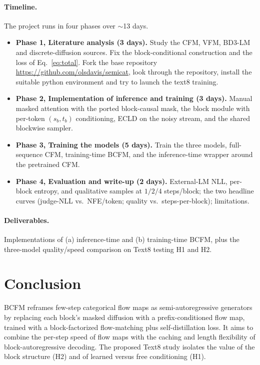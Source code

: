 \documentclass[twocolumn]{style}
\begin{document}
\paragraph{Timeline.} The project runs in four phases over $\sim$13 days.
\begin{itemize}
\item \textbf{Phase 1, Literature analysis (3 days).} Study the CFM, VFM, BD3-LM and discrete-diffusion sources. Fix the block-conditional construction and the loss of Eq.~\eqref{eq:total}. Fork the base repository \url{https://github.com/olsdavis/semicat}, look through the repository, install the suitable python environment and try to launch the text8 training.
\item \textbf{Phase 2, Implementation of inference and training (3 days).} Manual masked attention with the ported block-causal mask, the block module with per-token $(s_b,t_b)$ conditioning, ECLD on the noisy stream, and the shared blockwise sampler.
\item \textbf{Phase 3, Training the models (5 days).} Train the three models, full-sequence CFM, training-time BCFM, and the inference-time wrapper around the pretrained CFM.
\item \textbf{Phase 4, Evaluation and write-up (2 days).} External-LM NLL, per-block entropy, and qualitative samples at $1/2/4$ steps/block; the two headline curves (judge-NLL vs.\ NFE/token; quality vs.\ steps-per-block); limitations.
\end{itemize}

\paragraph{Deliverables.} Implementations of (a) inference-time and (b) training-time BCFM, plus the three-model quality/speed comparison on Text8 testing H1 and H2.


\section{Conclusion}
BCFM reframes few-step categorical flow maps as semi-autoregressive generators by replacing each block's masked diffusion with a prefix-conditioned flow map, trained with a block-factorized flow-matching plus self-distillation loss. It aims to combine the per-step speed of flow maps with the caching and length flexibility of block-autoregressive decoding. The proposed Text8 study isolates the value of the block structure (H2) and of learned versus free conditioning (H1).


\printbibliography
\end{document}

